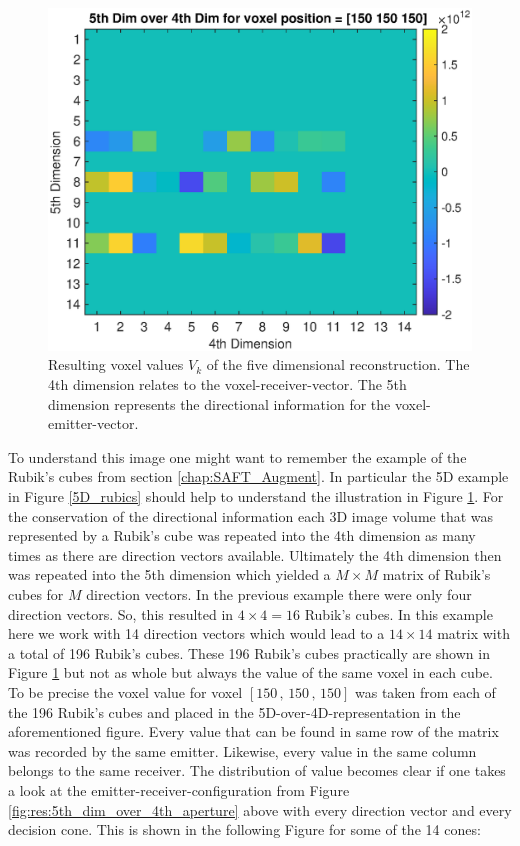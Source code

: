  
\begin{figure}[H]
    \centering
    \includegraphics[width=0.89\linewidth]{Graphics/Results/4d_5d/5thDim_over_4thDim_150_150_150.eps}
    \caption{Resulting voxel values $V_k$ of the five dimensional reconstruction. The 4th dimension relates to the voxel-receiver-vector. The 5th dimension represents the directional information for the voxel-emitter-vector.}
    \label{fig:res:5th_dim_over_4th_result}
\end{figure}

To understand this image one might want to remember the example of the Rubik's cubes from section \ref{chap:SAFT_Augment}. In particular the 5D example in Figure \ref{5D_rubics} should help to understand the illustration in Figure \ref{fig:res:5th_dim_over_4th_result}. For the conservation of the directional information each 3D image volume that was represented by a Rubik's cube was repeated into the 4th dimension as many times as there are direction vectors available. Ultimately the 4th dimension then was repeated into the 5th dimension which yielded a $M \times M$ matrix of Rubik's cubes for $M$ direction vectors. In the previous example there were only four direction vectors. So, this resulted in $4 \times 4 = 16$ Rubik's cubes. In this example here we work with 14 direction vectors which would lead to a $14 \times 14$ matrix with a total of 196 Rubik's cubes. These 196 Rubik's cubes practically are shown in Figure \ref{fig:res:5th_dim_over_4th_result} but not as whole but always the value of the same voxel in each cube. To be precise the voxel value for voxel $[150\, , \, 150\, , \, 150]$ was taken from each of the 196 Rubik's cubes and placed in the 5D-over-4D-representation in the aforementioned figure.
Every value that can be found in same row of the matrix was recorded by the same emitter. Likewise, every value in the same column belongs to the same receiver. The distribution of value becomes clear if one takes a look at the emitter-receiver-configuration from Figure \ref{fig:res:5th_dim_over_4th_aperture} above with every direction vector and every decision cone. This is shown in the following Figure for some of the 14 cones:


